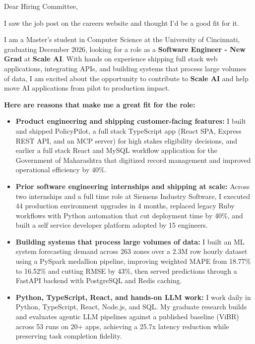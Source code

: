 \documentclass[11pt]{letter}
\date{}
\begin{document}
\begin{letter}{}

\opening{Dear Hiring Committee,}

I saw the job post on the careers website and thought I'd be a good fit for it.

I am a Master's student in Computer Science at the University of Cincinnati, graduating December 2026, looking for a role as a \textbf{Software Engineer - New Grad} at \textbf{Scale AI}. With hands on experience shipping full stack web applications, integrating APIs, and building systems that process large volumes of data, I am excited about the opportunity to contribute to \textbf{Scale AI} and help move AI applications from pilot to production impact.

\textbf{Here are reasons that make me a great fit for the role:}

\begin{itemize}[leftmargin=*, itemsep=0.4em]
    \item \textbf{Product engineering and shipping customer-facing features:} I built and shipped PolicyPilot, a full stack TypeScript app (React SPA, Express REST API, and an MCP server) for high stakes eligibility decisions, and earlier a full stack React and MySQL workflow application for the Government of Maharashtra that digitized record management and improved operational efficiency by 40\%.

    \item \textbf{Prior software engineering internships and shipping at scale:} Across two internships and a full time role at Siemens Industry Software, I executed 44 production environment upgrades in 4 months, replaced legacy Ruby workflows with Python automation that cut deployment time by 40\%, and built a self service developer platform adopted by 15 engineers.

    \item \textbf{Building systems that process large volumes of data:} I built an ML system forecasting demand across 263 zones over a 2.3M row hourly dataset using a PySpark medallion pipeline, improving weighted MAPE from 18.77\% to 16.52\% and cutting RMSE by 43\%, then served predictions through a FastAPI backend with PostgreSQL and Redis caching.

    \item \textbf{Python, TypeScript, React, and hands-on LLM work:} I work daily in Python, TypeScript, React, Node.js, and SQL. My graduate research builds and evaluates agentic LLM pipelines against a published baseline (ViBR) across 53 runs on 20+ apps, achieving a 25.7x latency reduction while preserving task completion fidelity.
\end{itemize}


\end{letter}
\end{document}
